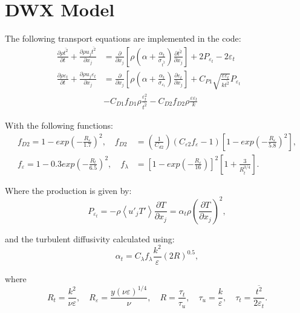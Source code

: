 \documentclass[paper=a4, fontsize=12pt]{scrartcl} %
\newcommand{\rave}[1]{\left<{#1}\right>}
\newcommand{\pd}{\partial }
\newcommand{\eps}{{\varepsilon}}
\begin{document}
\section{DWX Model}
The following transport equations are implemented in the code:
\begin{equation} \label{eq:ktDeng}
\begin{split}
\frac{\pd \rho \overline{t^2}}{\pd t} + \frac{\pd \rho u_j \overline{t^2}}{\pd x_j} &= \frac{\pd}{\pd x_j}\left[\rho \left(\alpha + \frac{\alpha_t}{\sigma_{\overline{t^2}}}\right)\frac{\pd \overline{t^2}}{\pd x_j}\right] + 2 P_{\eps_t}- 2 \varepsilon_t \\
\frac{\pd \rho \varepsilon_t}{\pd t} + \frac{\pd \rho u_j \varepsilon_t}{\pd x_j} &= \frac{\pd}{\pd x_j}\left[\rho \left(\alpha + \frac{\alpha_t}{\sigma_{\varepsilon_t}}\right)\frac{\pd \varepsilon_t}{\pd x_j}\right] + C_{P1}\sqrt{\frac{\eps\eps_t}{k\overline{t^2}}} P_{\eps_t} \qquad \\ &- C_{D1} f_{D1}\rho\frac{\eps_t^2}{\overline{t^2}}  - C_{D2} f_{D2}\rho\frac{\eps\eps_t}{k}   
\end{split}
\end{equation}

With the following functions:
\begin{equation}
\begin{split}
f_{D2} = 1-exp\left(-\frac{R_\eps}{1.7}\right)^2,\quad f_{D2} &= \left(\frac{1}{C_{d2}}\right)(C_{\eps2}f_\eps-1)\left[1-exp\left(-\frac{R_\eps}{5.8}\right)^2\right], \\
f_\eps = 1-0.3exp\left(-\frac{R_t}{6.5}\right)^2, \quad f_\lambda &= \left[1-exp\left(-\frac{R_\eps}{16}\right)\right]^2\left[1+\frac{3}{R_t^{3/4}}\right].
\end{split}
\end{equation}

Where the production is given by:
\begin{equation}
P_{\eps_t}=-\rho \rave{u'_j T'} \frac{\pd T}{ \pd x_j}= \alpha_t \rho \left(\frac{ \pd T}{\pd x_j}\right)^2,
\end{equation} 

and the turbulent diffusivity calculated using:
\begin{equation}
\alpha_t = C_\lambda f_\lambda \frac{k^2}{\eps}(2R)^{0.5},
\end{equation} 

where
\begin{equation}
R_t = \frac{k^2}{\nu\eps}, \quad R_\eps = \frac{y(\nu\eps)^{1/4}}{\nu}, \quad R = \frac{\tau_t}{\tau_u}, \quad \tau_u = \frac{k}{\eps}, \quad \tau_t = \frac{\overline{t^2}}{2\eps_t}.
\end{equation}
\end{document}

